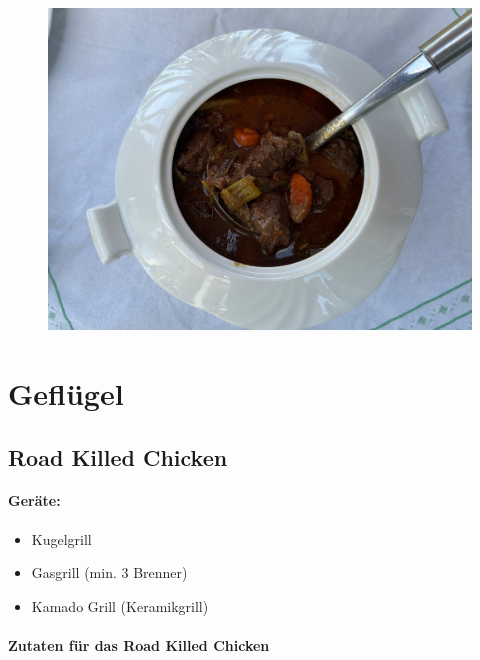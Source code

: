 \begin{figure}[htbp]
	\centering
	\begin{minipage}{1\textwidth}
		\centering
		\includegraphics[width=1\linewidth]{pics/Irish_Stew}
		\label{fig:Irish_Stew}
	\end{minipage}
\end{figure}
\newpage


\section{Geflügel}

\subsection{Road Killed Chicken}

\paragraph{Geräte:}

\begin{itemize}[noitemsep]
	\item Kugelgrill
 	\item Gasgrill (min. 3 Brenner)
	\item Kamado Grill (Keramikgrill)
\end{itemize}

\paragraph{Zutaten für das Road Killed Chicken}


